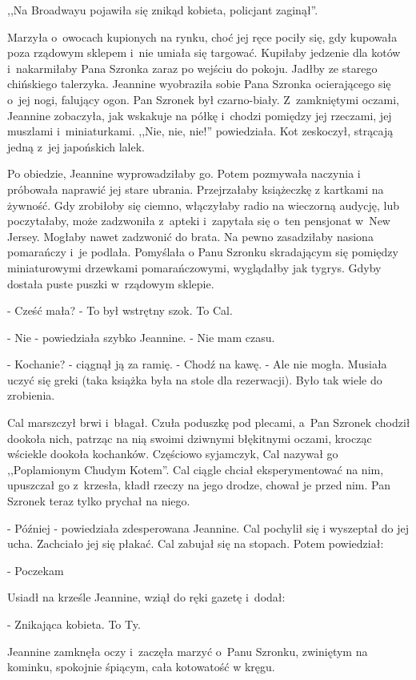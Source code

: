 \documentclass[oneside,polish,12pt,sfheadings]{mwbk}
\begin{document}
,,Na Broadwayu pojawiła się znikąd kobieta, policjant zaginął''. 

Marzyła o~owocach kupionych na rynku, choć jej
ręce pociły się, gdy kupowała poza rządowym sklepem i~nie umiała się
targować. Kupiłaby jedzenie dla kotów i~nakarmiłaby Pana Szronka zaraz
po wejściu do pokoju. Jadłby ze starego chińskiego talerzyka. Jeannine
wyobraziła sobie Pana Szronka ocierającego się o~jej nogi, falujący
ogon. Pan Szronek był czarno-biały. Z~zamkniętymi oczami, Jeannine
zobaczyła, jak wskakuje na półkę i~chodzi pomiędzy jej rzeczami, jej
muszlami i~miniaturkami. ,,Nie, nie, nie!'' powiedziała. Kot zeskoczył,
strącają jedną z~jej japońskich lalek.

Po obiedzie, Jeannine wyprowadziłaby go. Potem pozmywała naczynia
i próbowała naprawić jej stare ubrania. Przejrzałaby książeczkę z
kartkami na żywność. Gdy zrobiłoby się ciemno, włączyłaby radio na
wieczorną audycję, lub poczytałaby, może zadzwoniła z~apteki i~zapytała
się o~ten pensjonat w~New Jersey. Mogłaby nawet zadzwonić do brata.
Na pewno zasadziłaby nasiona pomarańczy i~je podlała. Pomyślała o
Panu Szronku skradającym się pomiędzy miniaturowymi drzewkami pomarańczowymi,
wyglądałby jak tygrys. Gdyby dostała puste puszki w~rządowym sklepie.

- Cześć mała? - To był wstrętny szok. To Cal.

- Nie - powiedziała szybko Jeannine. - Nie mam czasu.

- Kochanie? - ciągnął ją za ramię. - Chodź na kawę. - Ale nie mogła. Musiała
uczyć się greki (taka książka była na stole dla rezerwacji). Było
tak wiele do zrobienia.

Cal marszczył brwi i~błagał. Czuła poduszkę pod plecami, a~Pan Szronek
chodził dookoła nich, patrząc na nią swoimi dziwnymi błękitnymi oczami,
krocząc wściekle dookoła kochanków. Częściowo syjamczyk, Cal nazywał
go ,,Poplamionym Chudym Kotem''. Cal ciągle chciał eksperymentować na
nim, upuszczał go z~krzesła, kładł rzeczy na jego drodze, chował je
przed nim. Pan Szronek teraz tylko prychał na niego.

- Później - powiedziała zdesperowana Jeannine. Cal pochylił się i
wyszeptał do jej ucha. Zachciało jej się płakać. Cal zabujał się na
stopach. Potem powiedział: 

- Poczekam 

Usiadł na krześle Jeannine,
wziął do ręki gazetę i~dodał: 

- Znikająca kobieta. To Ty. 

Jeannine zamknęła oczy i~zaczęła marzyć o~Panu Szronku, zwiniętym na kominku, spokojnie śpiącym, cała kotowatość
w kręgu.
\end{document}
